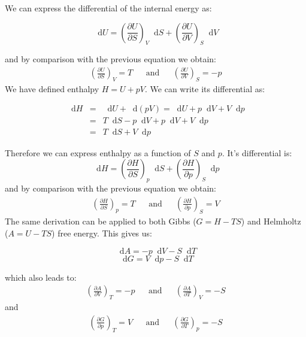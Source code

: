 \documentclass[12pt,a4paper]{report}
\newcommand*\diff{\mathop{}\!\mathrm{d}}
\newif\ifstudents
\begin{document}
   We can express the differential of the internal energy as:
   \ifstudents \hideit[2]{ \fi
   \begin{equation*}
   \diff U=\left(\frac{\partial U}{\partial S}\right)_{V} \diff S+\left(\frac{\partial U}{\partial V}\right)_{S} \diff V
   \end{equation*}
   \ifstudents } \fi
   and by comparison with the previous equation we obtain:
   \begin{align*}
   \left(\frac{\partial U}{\partial S}\right)_{V}=T &&\mathrm{and}&& 
   \left(\frac{\partial U}{\partial V}\right)_{S}=-p
   \end{align*}
   We have defined enthalpy $H = U+pV$. We can write its differential as:
   \ifstudents \hideit[2]{ \fi
   \begin{eqnarray*}
   \diff H &=& \diff U+\diff(pV)= \diff U+p\diff V + V\diff p \\
   &=&T\diff S-p\diff V+p\diff V + V\diff p\\
   &=& T\diff S+V\diff p
   \end{eqnarray*}
   \ifstudents } \fi
   Therefore we can express enthalpy as a function of $S$ and $p$. It's differential is:
   \begin{equation*}
   \diff H=\left(\frac{\partial H}{\partial S}\right)_{p} \diff S+\left(\frac{\partial H}{\partial p}\right)_{S} \diff p
   \end{equation*}
    and by comparison with the previous equation we obtain:
   \begin{align*}
   \left(\frac{\partial H}{\partial S}\right)_{p}=T &&\mathrm{and}&& 
   \left(\frac{\partial H}{\partial p}\right)_{S}=V
   \end{align*}
   The same derivation can be applied to both Gibbs ($G=H-TS$) and Helmholtz ($A=U-TS$) free energy. This gives us:
   \ifstudents \hideit[2]{ \fi
   \begin{equation*}
   \diff A= -p \diff V -S \diff T 
   \end{equation*}
   \begin{equation*}
   \diff G= V \diff p-S \diff T
   \end{equation*}
   \ifstudents } \fi
   which also leads to:
   \begin{align*}
   \left(\frac{\partial A}{\partial V}\right)_{T}=-p &&\mathrm{and}&& 
   \left(\frac{\partial A}{\partial T}\right)_{V}=-S
   \end{align*}
   and 
   \begin{align*}
   \left(\frac{\partial G}{\partial p}\right)_{T}=V &&\mathrm{and}&& 
   \left(\frac{\partial G}{\partial T}\right)_{p}=-S
   \end{align*}
\end{document}

